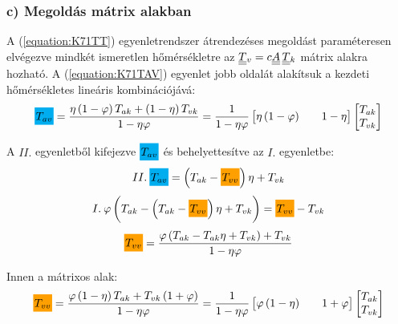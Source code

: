 \subsubsection*{c) Megoldás mátrix alakban}
A (\ref{equation:K71TT}) egyenletrendszer átrendezéses megoldást paraméteresen elvégezve mindkét ismeretlen hőmérsékletre az $\mat{T}_v = c\mat{A}\,\mat{T}_k$ mátrix alakra hozható. A (\ref{equation:K71TAV}) egyenlet jobb oldalát alakítsuk a kezdeti hőmérsékletes lineáris kombinációjává:
\begin{equation}
	\highlight{cyan}{T_{av}} = \dfrac{
		\eta \left( 1 - \varphi \right) T_{ak} + \left( 1 - \eta \right) T_{vk}
	}{
		1-\eta \varphi
	}
	=
	\dfrac{1}{1-\eta \varphi}
	\begin{bmatrix}
		\eta \left( 1 - \varphi \right) && 1 - \eta
	\end{bmatrix}
	\begin{bmatrix}
		T_{ak} \\
		T_{vk}
	\end{bmatrix}
\end{equation}

A $II.$ egyenletből kifejezve $\highlight{cyan}{T_{av}}$ és behelyettesítve az $I.$ egyenletbe:
\begin{equation}
	II.\: \highlight{cyan}{T_{av}} = \left(T_{ak} - \highlight{orange!75!yellow}{T_{vv}}\right) \eta + T_{vk}
\end{equation}
\begin{equation}
	I.\: \varphi \left( T_{ak} - \left(T_{ak} - \highlight{orange!75!yellow}{T_{vv}}\right) \eta + T_{vk} \right) 
	= 
	\highlight{orange!75!yellow}{T_{vv}} - T_{vk} 
\end{equation}
\begin{equation}
	\highlight{orange!75!yellow}{T_{vv}}
	=
	\dfrac{
		\varphi \left( T_{ak} - T_{ak} \eta + T_{vk} \right) + T_{vk}
	}{
		1 - \eta \varphi
	}
\end{equation}

Innen a mátrixos alak:
\begin{equation}
	\highlight{orange!75!yellow}{T_{vv}}
	=
	\dfrac{
		\varphi \left( 1 - \eta \right) T_{ak} + T_{vk} \left( 1 + \varphi \right)
	}{
		1 - \eta \varphi
	}
	=
	\dfrac{1}{1-\eta \varphi}
	\begin{bmatrix}
		\varphi \left( 1 - \eta \right) && 1 + \varphi
	\end{bmatrix}
	\begin{bmatrix}
		T_{ak} \\
		T_{vk}
	\end{bmatrix}
\end{equation}

